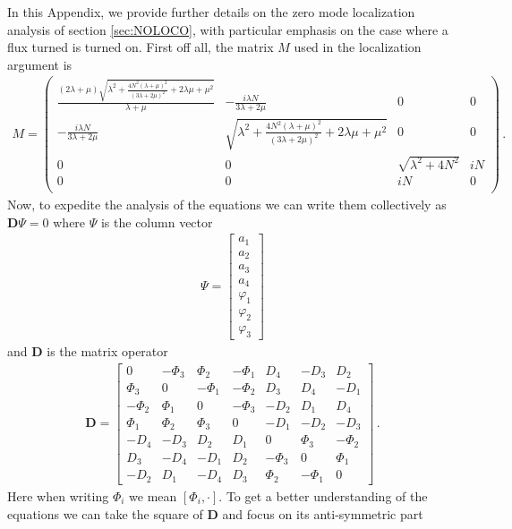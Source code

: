 \documentclass[12pt]{article}%
\numberwithin{equation}{section}
\newcommand{\al}[1]{\begin{align}#1\end{align}}
\renewcommand{\(}{\left(}
\renewcommand{\)}{\right)}
\renewcommand{\[}{\left[}
\renewcommand{\]}{\right]}
\begin{document}
In this Appendix, we provide further details on the zero mode localization analysis of section \ref{sec:NOLOCO},
with particular emphasis on the case where a flux turned is turned on. First off all, the
matrix $M$ used in the localization argument is
%
\al{M = \left(
\begin{array}{cccc}\label{eq:M}
 \frac{(2 \lambda +\mu ) \sqrt{\lambda ^2+\frac{4 N ^2 (\lambda +\mu )^2}{(3 \lambda
   +2 \mu )^2}+2 \lambda  \mu +\mu ^2}}{\lambda +\mu } & -\frac{i \lambda  N }{3
   \lambda +2 \mu } & 0 & 0 \\
 -\frac{i \lambda  N }{3 \lambda +2 \mu } & \sqrt{\lambda ^2+\frac{4 N ^2 (\lambda
   +\mu )^2}{(3 \lambda +2 \mu )^2}+2 \lambda  \mu +\mu ^2} & 0 & 0 \\
 0 & 0 & \sqrt{\lambda ^2+4 N ^2} & i N  \\
 0 & 0 & i N  & 0 \\
\end{array}
\right)\,.
}
%
Now, to expedite the analysis of the equations we can write them collectively as $\mathbf{D }\Psi = 0$ where $\Psi$ is the column vector
%
\al{\Psi = \left[\begin{array}{c}a_1\\a_2\\a_3\\a_4\\\varphi_1 \\ \varphi_2 \\ \varphi_3 \end{array}\right]
}
%
and $\mathbf D$ is the matrix operator
%
\al{\mathbf D = \left[\begin{array}{ccccccc}0 & - \Phi_3  & \Phi_2 & -\Phi_1 & D_4 & -D_3 & D_2\\ \Phi_3 & 0 & -\Phi_1 & -\Phi_2 & D_3 & D_4 & -D_1 \\ -\Phi_2 & \Phi_1 & 0 & -\Phi_3 & -D_2 & D_1 & D_4 \\ \Phi_1 & \Phi_2 & \Phi_3 & 0 & -D_1 & -D_2 & -D_3\\ -D_4 & -D_3 & D_2 & D_1 & 0 & \Phi_3 & - \Phi_2 \\ D_3 & -D_4 & -D_1 & D_2  & -\Phi_3 & 0 & \Phi_1 \\ -D_2 & D_1 & -D_4 & D_3 & \Phi_2 & -\Phi_1 & 0\end{array}\right]\,.
}
%
Here when writing $\Phi_i$ we mean $[\Phi_i, \cdot]$. To get a better understanding of the equations we can take the square of $\mathbf{D}$ and focus on its anti-symmetric part
%
\end{document}
